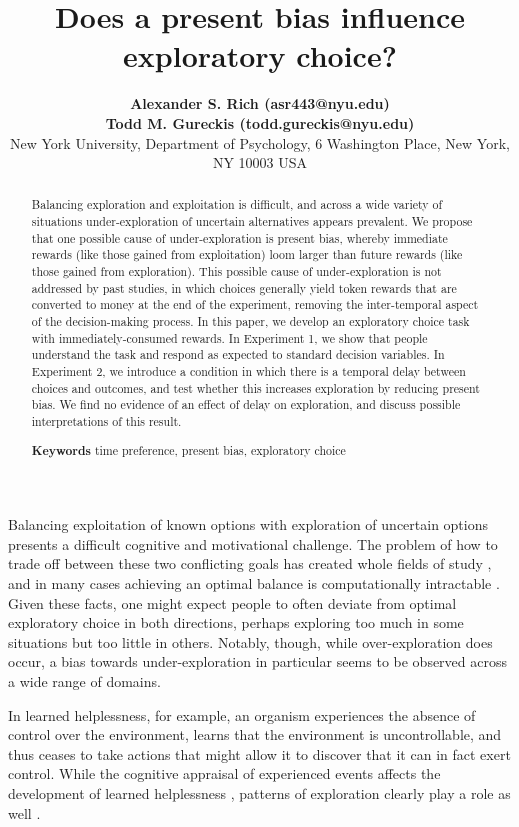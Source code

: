 \documentclass[10pt,letterpaper]{article}
\title{Does a present bias influence exploratory choice?}
\author{  {\large \bf Alexander S. Rich (asr443@nyu.edu)} \\ {\large\bf Todd M. Gureckis (todd.gureckis@nyu.edu)}\\
        New York University, Department of Psychology, 6 Washington Place, New York, NY 10003 USA}
\begin{document}
\maketitle

\begin{abstract}

  Balancing exploration and exploitation is difficult, and across a wide
  variety of situations under-exploration of uncertain alternatives appears prevalent.
  We propose that one possible cause of
  under-exploration is present bias, whereby immediate rewards (like those
  gained from exploitation) loom larger than future rewards (like those
  gained from exploration). This possible cause of under-exploration is not
  addressed by past studies, in which choices generally yield token rewards
  that are converted to money at the end of the experiment, removing the
  inter-temporal aspect of the decision-making process. In this paper, we
  develop an exploratory choice task with immediately-consumed rewards. In
  Experiment 1, we show that people understand the task and respond as expected
  to standard decision variables. In Experiment 2, we introduce a condition in
  which there is a temporal delay between choices and outcomes, and test whether
  this increases exploration by reducing present bias. We find no evidence of an
  effect of delay on exploration, and discuss possible interpretations of this result.

  \textbf{Keywords} time preference, present bias, exploratory choice
\end{abstract}

Balancing exploitation of known options with exploration of uncertain options
presents a difficult cognitive and motivational challenge. The problem of how to
trade off between these two conflicting goals has created whole fields of study
\citep{Mehlhorn2015, sutton1998reinforcement}, and in many cases achieving an
optimal balance is computationally intractable \citep{Guez2013}. Given these
facts, one might expect people to often deviate from optimal exploratory choice
in both directions, perhaps exploring too much in some situations but too little
in others. Notably, though, while over-exploration does occur, a bias towards under-exploration in particular seems to be
observed across a wide range of domains.

In learned helplessness, for example, an organism
experiences the absence of control over the environment, learns that the
environment is uncontrollable, and thus ceases to take actions that might allow
it to discover that it can in fact exert control. %
While the cognitive appraisal of experienced events affects the development of
learned helplessness \citep{Abramson1978}, patterns of exploration clearly play
a role as well \citep{Huys2009, Teodorescu2014a}. %
\end{document}
